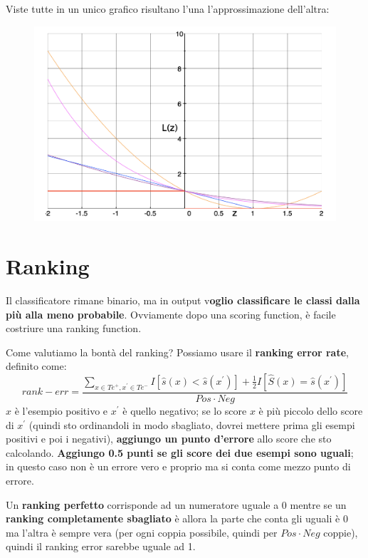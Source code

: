 Viste tutte in un unico grafico risultano l'una l'approssimazione dell'altra:
\begin{figure}[!h]
    \centering
    \includegraphics[scale=0.5]{images/allLoss.png}
    \label{fig:enter-label}
\end{figure}

\newpage

\section{Ranking}
Il classificatore rimane binario, ma in output v\textbf{oglio classificare le classi dalla più alla meno probabile}. Ovviamente dopo una scoring function, è facile costriure una ranking function.

Come valutiamo la bontà del ranking? Possiamo usare il \textbf{ranking error rate}, definito come:
\begin{equation}
    rank-err=\frac{\sum_{x\in Te^+,x^{'}\in Te^-}I[\hat{s}(x)<\hat{s}(x^{'})]+\frac{1}{2}I[\hat{S}(x)=\hat{s}(x^{'})]}{Pos\cdot Neg}
\end{equation}
$x$ è l'esempio positivo e $x^{'}$ è quello negativo; se lo score $x$ è più piccolo dello score di $x^{'}$ (quindi sto ordinandoli in modo sbagliato, dovrei mettere prima gli esempi positivi e poi i negativi), \textbf{aggiungo un punto d'errore} allo score che sto calcolando. \textbf{Aggiungo 0.5 punti se gli score dei due esempi sono uguali}; in questo caso non è un errore vero e proprio ma si conta come mezzo punto di errore.

Un \textbf{ranking perfetto} corrisponde ad un numeratore uguale a 0 mentre se un \textbf{ranking completamente sbagliato} è allora la parte che conta gli uguali è 0 ma l'altra è sempre vera (per ogni coppia possibile, quindi per $Pos\cdot Neg$ coppie), quindi il ranking error sarebbe uguale ad 1.

